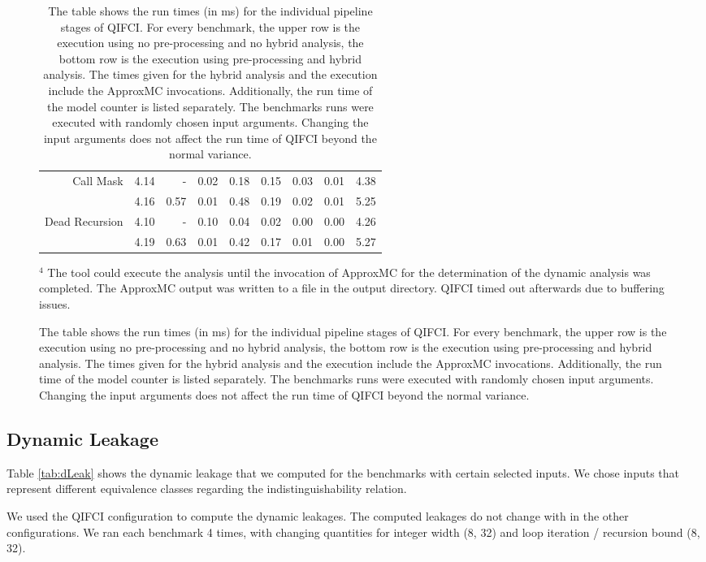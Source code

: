 \begin{figure}
\begin{table}[H]
{\begin{tabular}{r|r|r|r|rr|rr|r}
\multirow{2}{*}{Call Mask}              & 4.14           & -            & 0.02         & 0.18       & 0.15   & 0.03         & 0.01               & 4.38           \\
                                        & 4.16           & 0.57         & 0.01         & 0.48       & 0.19   & 0.02         & 0.01               & 5.25           \\\hline
\multirow{2}{*}{Dead Recursion}         & 4.10           & -            & 0.10         & 0.04       & 0.02   & 0.00         & 0.00               & 4.26           \\
                                        & 4.19           & 0.63         & 0.01         & 0.42       & 0.17   & 0.01         & 0.00               & 5.27          
\end{tabular}
}
\caption{The table shows the run times (in ms) for the individual pipeline stages of QIFCI. For every benchmark, the upper row is the execution using no pre-processing and no hybrid analysis, the bottom row is the execution using pre-processing and hybrid analysis. The times given for the hybrid analysis and the execution include the ApproxMC invocations. Additionally, the run time of the model counter is listed separately. The benchmarks runs were executed with randomly chosen input arguments. Changing the input arguments does not affect the run time of QIFCI beyond the normal variance.}\label{tab:time}
\end{table}
{\footnotesize $^4$ The tool could execute the analysis until the invocation of ApproxMC for the determination of the dynamic analysis was completed. The ApproxMC output was written to a file in the output directory. QIFCI timed out afterwards due to buffering issues.}
\end{figure}


\subsection{Dynamic Leakage}
Table \ref{tab:dLeak} shows the dynamic leakage that we computed for the benchmarks with certain selected inputs. We chose inputs that represent different equivalence classes regarding the indistinguishability relation.

We used the QIFCI configuration to compute the dynamic leakages. The computed leakages do not change with in the other configurations. We ran each benchmark 4 times, with changing quantities for integer width (8, 32) and loop iteration / recursion bound (8, 32).

